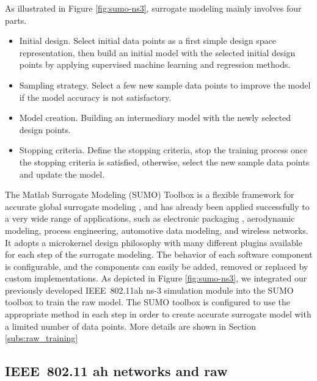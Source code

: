  As illustrated in Figure \ref{fig:sumo-ns3},  surrogate modeling mainly involves four parts.
 \begin{itemize}
 \item  Initial design. Select initial data points as a first simple design space representation, then build an initial model with the selected initial design points by applying supervised machine learning and regression methods. 
 \item  Sampling strategy. Select a few new sample data points to improve the model if the model accuracy is not satisfactory.  \item  Model creation. Building an intermediary model with the newly selected design points. 
 \item  Stopping criteria. Define the stopping criteria, stop the training process once the stopping criteria is satisfied, otherwise, select the new sample data points and update the model. 
 \end{itemize}
  
 The Matlab Surrogate Modeling (SUMO) Toolbox is a flexible framework for accurate global surrogate modeling \cite{SUMOtoolbox2010}, and has already been applied successfully to a very wide range of applications, such as electronic packaging , aerodynamic modeling, process engineering, automotive data modeling, and wireless networks.
 It adopts a microkernel design philosophy with many different plugins available for each step of the surrogate modeling. The behavior of each software component is configurable, and the components can easily be added, removed or replaced by custom implementations. As depicted in Figure \ref{fig:sumo-ns3}, we integrated our previously developed IEEE~802.11ah ns-3 simulation module \cite{WNS32018} into the SUMO toolbox to train the \gls{raw} model. The SUMO toolbox is configured to use the appropriate method in each step in order to create  accurate surrogate model with a limited number of data points. More details are  shown in Section \ref{subs:raw_training}
 


\subsection{IEEE~802.11 ah networks and \gls{raw} \label{subsec:80211ah_raw}}

